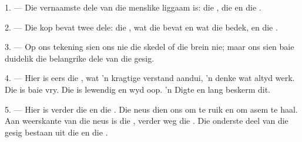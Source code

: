 %
%
%

\VUsaut{4.0mm}
\VUsaut{2.0mm}

\VUsaut{2.4mm}
\VUsaut{3.0mm}

\VUsaut{3.0mm}

1. --- Die vernaamste dele van die menslike liggaam is: die , die
 en die .

2. --- Die kop bevat twee dele: die , wat die  bevat en
wat die  bedek, en die .

3. --- Op ons tekening sien ons nie die skedel of die brein nie; maar ons sien baie
duidelik die belangrike dele van die gesig.

4. --- Hier is eers die , wat 'n kragtige verstand aandui, 'n denke wat
altyd werk. Die  is baie vry. Die  is lewendig en wyd oop. 'n
Digte  en lang  beskerm dit.

5. --- Hier is verder die  en die . Die neus dien ons om
te ruik en om asem te haal. Aan weerskante van die neus is die , verder
weg die . Die onderste deel van die gesig bestaan uit die  en
die .

